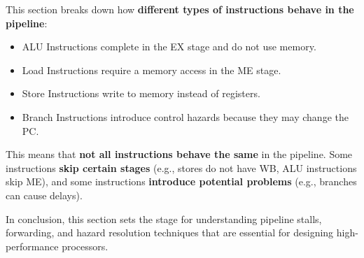 \highspace
This section breaks down how \textbf{different types of instructions behave in the pipeline}:
\begin{itemize}
   \item ALU Instructions complete in the EX stage and do not use memory.
   \item Load Instructions require a memory access in the ME stage.
   \item Store Instructions write to memory instead of registers.
   \item Branch Instructions introduce control hazards because they may change the PC.
\end{itemize}
This means that \textbf{not all instructions behave the same} in the pipeline. Some instructions \textbf{skip certain stages} (e.g., stores do not have WB, ALU instructions skip ME), and some instructions \textbf{introduce potential problems} (e.g., branches can cause delays).

\highspace
In conclusion, this section sets the stage for understanding pipeline stalls, forwarding, and hazard resolution techniques that are essential for designing high-performance processors.
